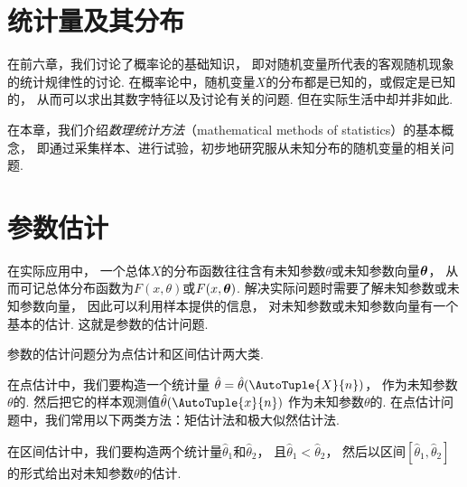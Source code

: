 


\chapter{统计量及其分布}
在前六章，我们讨论了概率论的基础知识，
即对随机变量所代表的客观随机现象的统计规律性的讨论.
在概率论中，随机变量\(X\)的分布都是已知的，或假定是已知的，
从而可以求出其数字特征以及讨论有关的问题.
但在实际生活中却并非如此.

在本章，我们介绍\emph{数理统计方法}（mathematical methods of statistics）的基本概念，
即通过采集样本、进行试验，初步地研究服从未知分布的随机变量的相关问题.







\chapter{参数估计}
在实际应用中，
一个总体\(X\)的分布函数往往含有未知参数\(\theta\)或未知参数向量\(\boldsymbol\theta\)，
从而可记总体分布函数为\(F(x,\theta)\)或\(F(x,\boldsymbol\theta)\).
解决实际问题时需要了解未知参数或未知参数向量，
因此可以利用样本提供的信息，
对未知参数或未知参数向量有一个基本的估计.
这就是参数的估计问题.

参数的估计问题分为点估计和区间估计两大类.

在点估计中，我们要构造一个统计量
\(\hat{\theta}=\hat{\theta}(\AutoTuple{X}{n})\)，
作为未知参数\(\theta\)的.
然后把它的样本观测值\(\hat{\theta}(\AutoTuple{x}{n})\)
作为未知参数\(\theta\)的.
在点估计问题中，我们常用以下两类方法：矩估计法和极大似然估计法.

在区间估计中，我们要构造两个统计量\(\hat{\theta}_1\)和\(\hat{\theta}_2\)，
且\(\hat{\theta}_1<\hat{\theta}_2\)，
然后以区间\([\hat{\theta}_1,\hat{\theta}_2]\)的形式给出对未知参数\(\theta\)的估计.










\endgroup
